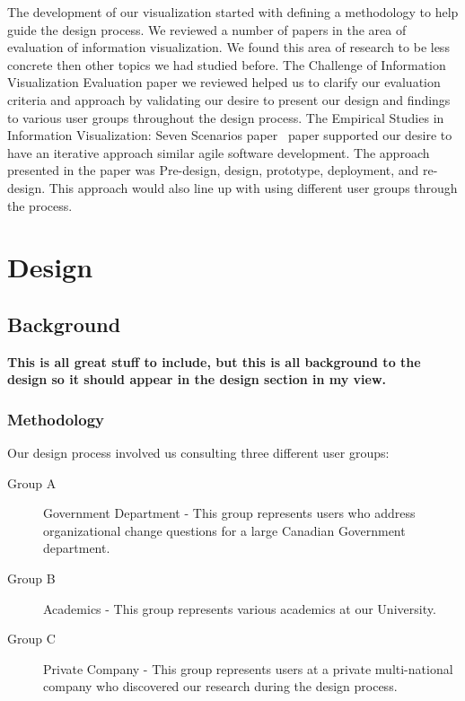 \message{ !name(FinalPaper.tex)}\documentclass[journal]{vgtc}                %
\begin{document}
The development of our visualization started with defining a methodology to help guide the design process.  We reviewed a number of papers in the area of evaluation of information visualization.  We found this area of research to be less concrete then other topics we had studied before.  The Challenge of Information Visualization Evaluation\cite{challengeofinfoviseval} paper we reviewed helped us to clarify our evaluation criteria and approach by validating our desire to present our design and findings to various user groups throughout the design process.  The Empirical Studies in Information Visualization: Seven Scenarios paper~\cite{lam2012empirical} paper supported our desire to have an iterative approach similar agile software development.  The approach presented in the paper was Pre-design, design, prototype, deployment, and re-design.  This approach would also line up with using different user groups through the process.

\section{Design}

\subsection{Background}

\textbf{{\color{Plum} This is all great stuff to include, but this is all background to the design so it should appear in the design section in my view. }}

\subsubsection{Methodology}


Our design process involved us consulting three different user groups:
\begin{description}
	\item [Group A] Government Department - This group represents users who address organizational change questions for a large Canadian Government department. 
	\item [Group B] Academics - This group represents various academics at our University.
	\item [Group C] Private Company - This group represents users at a private multi-national company who discovered our research during the design process.
\end{description}
\end{document}
